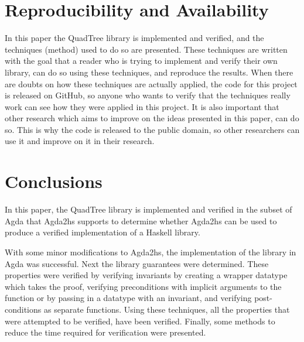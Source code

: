 \section{Reproducibility and Availability}
In this paper the QuadTree library is implemented and verified, and the techniques (method) used to do so are presented. These techniques are written with the goal that a reader who is trying to implement and verify their own library, can do so using these techniques, and reproduce the results. When there are doubts on how these techniques are actually applied, the code for this project is released on GitHub, so anyone who wants to verify that the techniques really work can see how they were applied in this project. It is also important that other research which aims to improve on the ideas presented in this paper, can do so. This is why the code is released to the public domain, so other researchers can use it and improve on it in their research.

\section{Conclusions}
In this paper, the QuadTree library is implemented and verified in the subset of Agda that Agda2hs supports to determine whether Agda2hs can be used to produce a verified implementation of a Haskell library. 

With some minor modifications to Agda2hs, the implementation of the library in Agda was successful. Next the library guarantees were determined. These properties were verified by verifying invariants by creating a wrapper datatype which takes the proof, verifying preconditions with implicit arguments to the function or by passing in a datatype with an invariant, and verifying post-conditions as separate functions.  Using these techniques, all the properties that were attempted to be verified, have been verified. Finally, some methods to reduce the time required for verification were presented.
